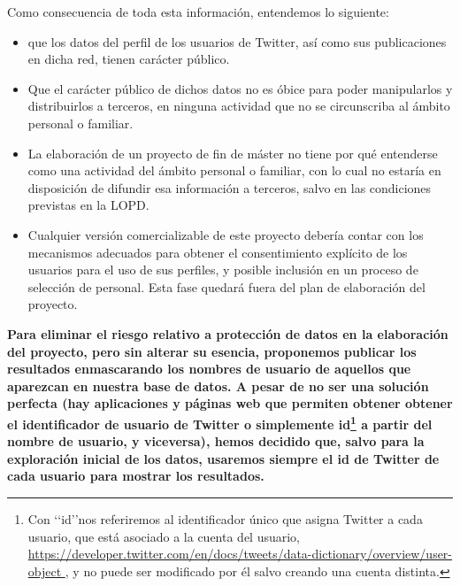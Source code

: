 Como consecuencia de toda esta información, entendemos lo siguiente:
\begin{itemize}
\item que los datos del perfil de los usuarios de Twitter, así como sus publicaciones en dicha red,
tienen carácter público.
\item Que el carácter público de dichos datos no es óbice para poder manipularlos y distribuirlos
a terceros, en ninguna actividad que no se circunscriba al ámbito personal o familiar.
\item La elaboración de un proyecto de fin de máster no tiene por qué entenderse como una 
actividad del ámbito personal o familiar, con lo cual no estaría en disposición de difundir esa información
a terceros, salvo en las condiciones previstas en la LOPD.
\item Cualquier versión comercializable de este proyecto debería contar con los mecanismos
adecuados para obtener el consentimiento explícito de los usuarios para el uso de sus perfiles, 
y posible inclusión en un proceso de selección de personal. Esta fase quedará fuera del plan de elaboración
del proyecto.
\end{itemize}
{\bf\color{oblue}
Para eliminar el riesgo relativo a protección de datos en la elaboración del proyecto, 
pero sin alterar su esencia, proponemos publicar los resultados enmascarando los nombres 
de usuario de aquellos que aparezcan en nuestra base de datos. A pesar de no ser una solución
perfecta (hay aplicaciones y páginas web que permiten obtener obtener el identificador de usuario
de Twitter o simplemente id\footnote{Con \lq\lq id\rq\rq nos referiremos al identificador único 
que asigna Twitter a cada usuario, que está asociado a la cuenta del usuario, \url{https://developer.twitter.com/en/docs/tweets/data-dictionary/overview/user-object },
y no puede ser modificado por él salvo creando una cuenta distinta.}
a partir del nombre de usuario, y viceversa), hemos decidido que, salvo 
para la exploración inicial de los datos, usaremos siempre el id de Twitter de
cada usuario para mostrar los resultados. }

